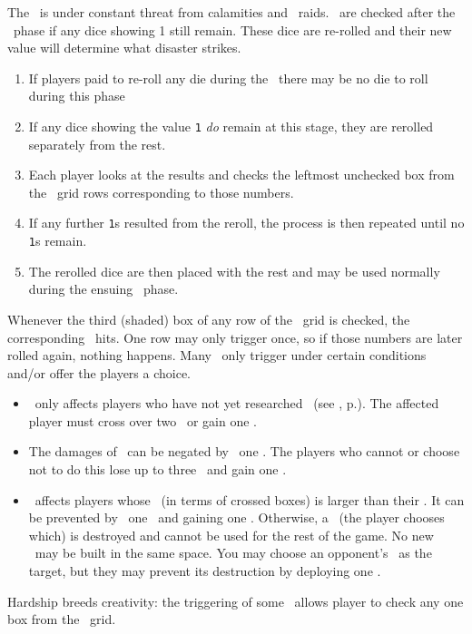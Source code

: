 The \planet\ is under constant threat from calamities and \pirate\ raids.  \disasters\ are checked after the \diplomacy\ phase if any dice showing 1 still remain.  These dice are re-rolled and their new value will determine what disaster strikes.
\begin{enumerate}
  \item If players paid to re-roll any die during the \diplomacy\ there may be no die to roll during this phase
  \item If any dice showing the value \texttt{1} \textit{do} remain at this stage, they are rerolled separately from the rest.
  \item Each player looks at the results and checks the leftmost unchecked box from the \disaster\ grid rows corresponding to those numbers.
  \item If any further \texttt{1}s resulted from the reroll, the process is then repeated until no \texttt{1}s remain.
  \item The rerolled dice are then placed with the rest and may be used normally during the ensuing \development\ phase.
\end{enumerate}
Whenever the third (shaded) box of any row of the \disaster\ grid is checked, the corresponding \disaster\ hits.  One row may only trigger once, so if those numbers are later rolled again, nothing happens.
\newline\newline
Many \disasters\ only trigger under certain conditions and/or offer the players a choice.
\begin{itemize}
  \item \pandemic\ only affects players who have not yet researched \cure\ (see , p.\pageref{sec:disasters}). The affected player must cross over two \population\ or gain one \unhappiness.
  \item The damages of \war\ can be negated by \deploying\ one \squadron.  The players who cannot or choose not to do this lose up to three \currency\ and gain one \unhappiness.
  \item \terrorism\ affects players whose \unhappiness\ (in terms of crossed boxes) is larger than their \happiness.  It can be prevented by \deploying\ one \squadron\ and gaining one \unhappiness.  Otherwise, a \fortification\ (the player chooses which) is destroyed and cannot be used for the rest of the game.  No new \fortifications\ may be built in the same space.  You may choose an opponent’s \battleship\ as the target, but they may prevent its destruction by deploying one \squadron.
\end{itemize}
Hardship breeds creativity: the triggering of some \disasters\ allows player to check any one box from the \culture\ grid.
